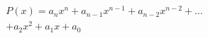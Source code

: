 \begin{multline*}
    P(x) = a_n x^n + a_{n-1} x^{n-1} + a_{n-2} x^{n-2} + \dots \\
    + a_2 x^2 + a_1 x + a_0
\end{multline*}
